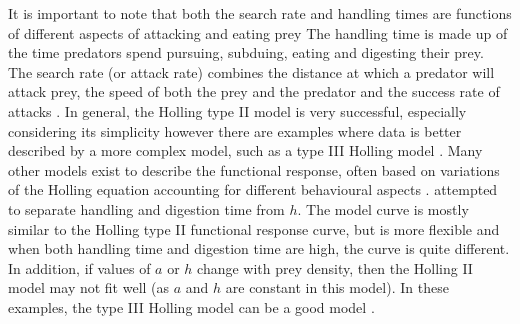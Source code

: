 \documentclass{article}
\begin{document}
It is important to note that both the search rate and handling times are functions of different aspects of attacking and eating prey \cite{Hassel1976TheDeath-Rate} The handling time is made up of the time predators spend pursuing, subduing, eating and digesting their prey. The search rate (or attack rate) combines the distance at which a predator will attack prey, the speed of both the prey and the predator and the success rate of attacks \cite{Holling1966}. In general, the Holling type II model is very successful, especially considering its simplicity however there are examples where data is better described by a more complex model, such as a type III Holling model \cite{Hassel1976TheDeath-Rate} . 
Many other models exist to describe the functional response, often based on variations of the Holling equation accounting for different behavioural aspects  \cite{Jeschke2002PredatorPrey}. \cite{Jeschke2002PredatorPrey} attempted to separate handling and digestion time from  $h$. The model curve is mostly similar to the Holling type II functional response curve, but is more flexible and when both handling time and digestion time are high, the curve is quite different. In addition, if values of $a$ or $h$ change with prey density, then the Holling II model may not fit well  (as $a$ and $h$ are constant in this model). In these examples, the type III Holling model can be a good model \cite{Hassel1976TheDeath-Rate}. 
\end{document}
